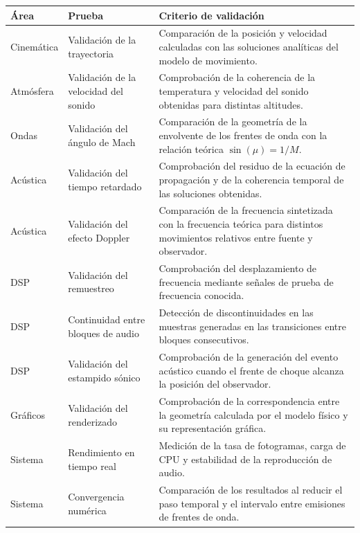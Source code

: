 \documentclass[10.5pt]{article}
\begin{document}
	\begin{table}[H]
		\centering
		\label{tab:tests}
		\begin{tabular}{|l|p{4cm}|p{10cm}|}
			\hline
			\textbf{Área} & \textbf{Prueba} & \textbf{Criterio de validación} \\
			\hline
			Cinemática &
			Validación de la trayectoria &
			Comparación de la posición y velocidad calculadas con las soluciones analíticas del modelo de movimiento. \\
			\hline
			Atmósfera &
			Validación de la velocidad del sonido &
			Comprobación de la coherencia de la temperatura y velocidad del sonido obtenidas para distintas altitudes. \\
			\hline
			Ondas &
			Validación del ángulo de Mach &
			Comparación de la geometría de la envolvente de los frentes de onda con la relación teórica $\sin(\mu)=1/M$. \\
			\hline
			Acústica &
			Validación del tiempo retardado &
			Comprobación del residuo de la ecuación de propagación y de la coherencia temporal de las soluciones obtenidas. \\
			\hline
			Acústica &
			Validación del efecto Doppler &
			Comparación de la frecuencia sintetizada con la frecuencia teórica para distintos movimientos relativos entre fuente y observador. \\
			\hline
			DSP &
			Validación del remuestreo &
			Comprobación del desplazamiento de frecuencia mediante señales de prueba de frecuencia conocida. \\
			\hline
			DSP &
			Continuidad entre bloques de audio &
			Detección de discontinuidades en las muestras generadas en las transiciones entre bloques consecutivos. \\
			\hline
			DSP &
			Validación del estampido sónico &
			Comprobación de la generación del evento acústico cuando el frente de choque alcanza la posición del observador. \\
			\hline
			Gráficos &
			Validación del renderizado &
			Comprobación de la correspondencia entre la geometría calculada por el modelo físico y su representación gráfica. \\
			\hline
			Sistema &
			Rendimiento en tiempo real &
			Medición de la tasa de fotogramas, carga de CPU y estabilidad de la reproducción de audio. \\
			\hline
			Sistema &
			Convergencia numérica &
			Comparación de los resultados al reducir el paso temporal y el intervalo entre emisiones de frentes de onda. \\
			\hline
		\end{tabular}
	\end{table}
	
\end{document}
